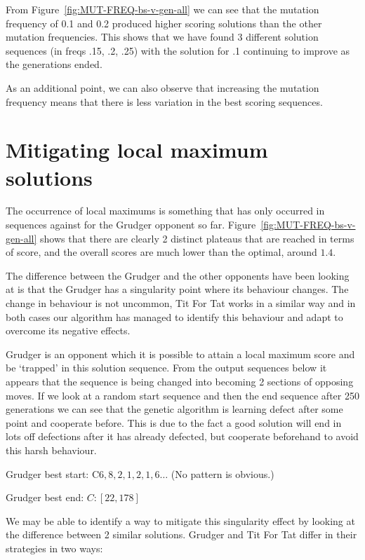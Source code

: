 From Figure~\ref{fig:MUT-FREQ-bs-v-gen-all} we can see that the mutation frequency of 0.1 and 0.2 produced higher scoring solutions than the other mutation frequencies.
This shows that we have found 3 different solution sequences (in freqs .15, .2, .25) with the solution for .1 continuing to improve as the generations ended.

As an additional point, we can also observe that increasing the mutation frequency means that there is less variation in the best scoring sequences.

\section{Mitigating local maximum solutions}\label{sec:mitigatingLocalMaximums}
The occurrence of local maximums is something that has only occurred in sequences against for the Grudger opponent so far.
Figure~\ref{fig:MUT-FREQ-bs-v-gen-all} shows that there are clearly 2 distinct plateaus that are reached in terms of score, and the overall scores are much lower than the optimal, around \(1.4\).

The difference between the Grudger and the other opponents have been looking at is that the Grudger has a singularity point where its behaviour changes.
The change in behaviour is not uncommon, Tit For Tat works in a similar way and in both cases our algorithm has managed to identify this behaviour and adapt to overcome its negative effects.

Grudger is an opponent which it is possible to attain a local maximum score and be `trapped' in this solution sequence.
From the output sequences below it appears that the sequence is being changed into becoming 2 sections of opposing moves.
If we look at a random start sequence and then the end sequence after 250 generations we can see that the genetic algorithm is learning defect after some point and cooperate before.
This is due to the fact a good solution will end in lots off defections after it has already defected, but cooperate beforehand to avoid this harsh behaviour.

Grudger best start: C$6,8,2,1,2,1,6\ldots$ (No pattern is obvious.)

Grudger best end: \(C:[22,178]\)

We may be able to identify a way to mitigate this singularity effect by looking at the difference between 2 similar solutions.
Grudger and Tit For Tat differ in their strategies in two ways:

